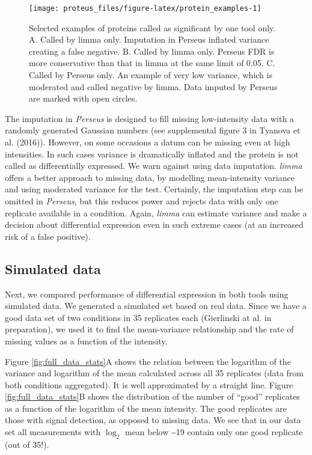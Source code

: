 \documentclass[]{article}
\begin{document}
\begin{figure}[H]

{\centering \texttt{[image: proteus\_files/figure-latex/protein\_examples-1]} 

}

\caption{\label{fig:protein_examples}Selected examples of proteins called as significant by one tool only. A. Called by limma only. Imputation in Perseus inflated variance creating a false negative. B. Called by limma only. Perseus FDR is more conservative than that in limma at the same limit of 0.05. C. Called by Perseus only. An example of very low variance, which is moderated and called negative by limma. Data imputed by Perseus are marked with open circles.}\label{fig:protein_examples}
\end{figure}

The imputation in \emph{Perseus} is designed to fill missing
low-intensity data with a randomly generated Gaussian numbers (see
supplemental figure 3 in Tyanova et al. (2016)). However, on some
occasions a datum can be missing even at high intensities. In such cases
variance is dramatically inflated and the protein is not called as
differentially expressed. We warn against using data imputation.
\emph{limma} offers a better approach to missing data, by modelling
mean-intensity variance and using moderated variance for the test.
Certainly, the imputation step can be omitted in \emph{Perseus}, but
this reduces power and rejects data with only one replicate available in
a condition. Again, \emph{limma} can estimate variance and make a
decision about differential expression even in such extreme cases (at an
increased risk of a false positive).

\subsection{Simulated data}\label{simulated-data}

Next, we compared performance of differential expression in both tools
using simulated data. We generated a simulated set based on real data.
Since we have a good data set of two conditions in 35 replicates each
(Gierlinski at al. in preparation), we used it to find the mean-variance
relationship and the rate of missing values as a function of the
intensity.

Figure \ref{fig:full_data_stats}A shows the relation between the
logarithm of the variance and logarithm of the mean calculated across
all 35 replicates (data from both conditions aggregated). It is well
approximated by a straight line. Figure \ref{fig:full_data_stats}B shows
the distribution of the number of ``good'' replicates as a function of
the logarithm of the mean intensity. The good replicates are those with
signal detection, as opposed to missing data. We see that in our data
set all measurements with \(\log_2\) mean below \textasciitilde{}19
contain only one good replicate (out of 35!).
\end{document}
